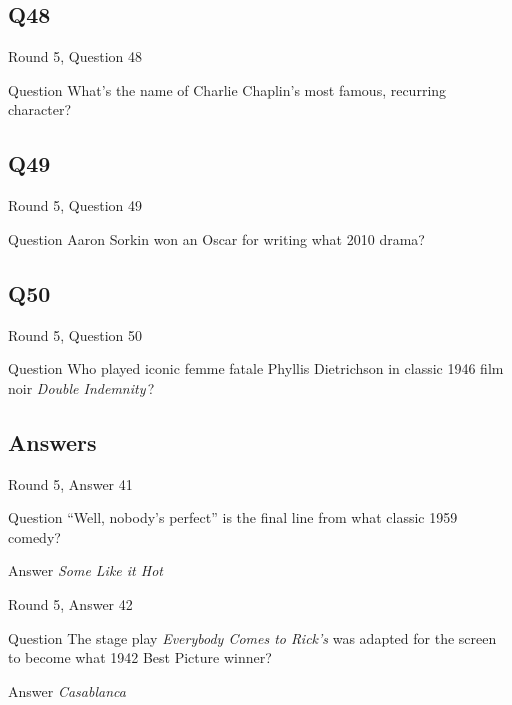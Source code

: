 \documentclass[11pt]{beamer}
\begin{document}
\subsection*{Q48}
\begin{frame}[t]{Round 5, Question 48}
\vspace{2em}
\begin{block}{Question}
What's the name of Charlie Chaplin's most famous, recurring character?
\end{block}
\end{frame}
    

\subsection*{Q49}
\begin{frame}[t]{Round 5, Question 49}
\vspace{2em}
\begin{block}{Question}
Aaron Sorkin won an Oscar for writing what 2010 drama?
\end{block}
\end{frame}
    

\subsection*{Q50}
\begin{frame}[t]{Round 5, Question 50}
\vspace{2em}
\begin{block}{Question}
Who played iconic femme fatale Phyllis Dietrichson in classic 1946 film noir \emph{Double Indemnity}\,?
\end{block}
\end{frame}
    
\subsection{Answers}

\begin{frame}[t]{Round 5, Answer 41}
\vspace{2em}
\begin{block}{Question}
``Well, nobody's perfect'' is the final line from what classic 1959 comedy?
\end{block}
\pause{}
\begin{block}{Answer}
\emph{Some Like it Hot}
\end{block}
\end{frame}
    

\begin{frame}[t]{Round 5, Answer 42}
\vspace{2em}
\begin{block}{Question}
The stage play \emph{Everybody Comes to Rick's} was adapted for the screen to become what 1942 Best Picture winner?
\end{block}
\pause{}
\begin{block}{Answer}
\emph{Casablanca}
\end{block}
\end{frame}
    
\end{document}

